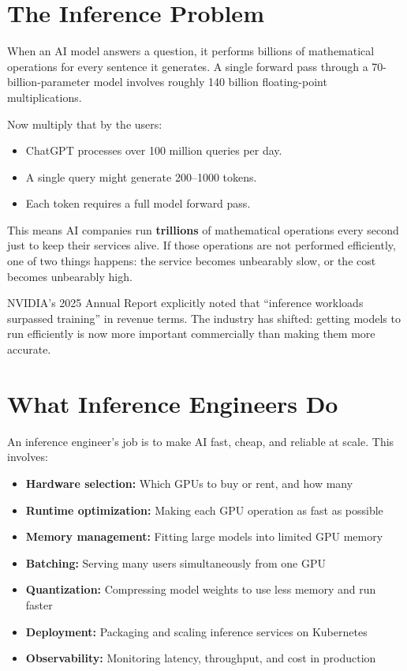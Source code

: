 \documentclass[10pt, oneside, openany]{book}
\newcommand{\notebox}[2]{\begin{tcolorbox}[notestyle, title={#1}]#2\end{tcolorbox}}
\begin{document}
\section{The Inference Problem}

When an AI model answers a question, it performs billions of mathematical
operations for every sentence it generates.  A single forward pass through a
70-billion-parameter model involves roughly 140 billion floating-point
multiplications.

\bigskip
\noindent Now multiply that by the users:

\begin{itemize}
  \item ChatGPT processes over 100 million queries per day.
  \item A single query might generate 200--1000 tokens.
  \item Each token requires a full model forward pass.
\end{itemize}

\noindent This means AI companies run \textbf{trillions} of mathematical operations
every second just to keep their services alive.  If those operations are not
performed efficiently, one of two things happens: the service becomes unbearably slow,
or the cost becomes unbearably high.

\notebox{Key Insight}{
NVIDIA's 2025 Annual Report explicitly noted that ``inference workloads surpassed
training'' in revenue terms.  The industry has shifted: getting models to run
efficiently is now more important commercially than making them more accurate.
}

\section{What Inference Engineers Do}

An inference engineer's job is to make AI fast, cheap, and reliable at scale.
This involves:

\begin{itemize}
  \item \textbf{Hardware selection:} Which GPUs to buy or rent, and how many
  \item \textbf{Runtime optimization:} Making each GPU operation as fast as possible
  \item \textbf{Memory management:} Fitting large models into limited GPU memory
  \item \textbf{Batching:} Serving many users simultaneously from one GPU
  \item \textbf{Quantization:} Compressing model weights to use less memory and run faster
  \item \textbf{Deployment:} Packaging and scaling inference services on Kubernetes
  \item \textbf{Observability:} Monitoring latency, throughput, and cost in production
\end{itemize}
\end{document}
